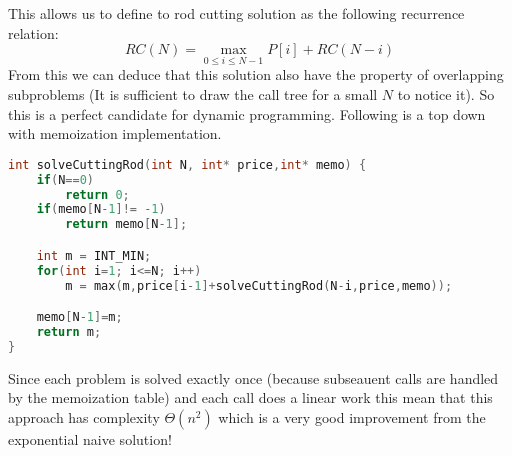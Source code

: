 This allows us to define to rod cutting solution as the following recurrence relation:
\[
RC(N) = \max_{0\leq i\leq N-1} P[i] + RC(N-i)
\]
From this we can deduce that this solution also have the property of overlapping subproblems (It is sufficient to draw the call tree for a small $N$ to notice it).
So this is a perfect candidate for dynamic programming.
Following is a top down with memoization implementation.
\begin{lstlisting}[language=c++, caption="Binary knapsack problem -Memoized solution",label=list:knapqudratic]
int solveCuttingRod(int N, int* price,int* memo) {
    if(N==0)
        return 0;
    if(memo[N-1]!= -1)
        return memo[N-1];

    int m = INT_MIN;
    for(int i=1; i<=N; i++)
        m = max(m,price[i-1]+solveCuttingRod(N-i,price,memo));

    memo[N-1]=m;
    return m;
}

	\end{lstlisting}
Since each problem is solved exactly once (because subseauent calls are handled by the memoization table) and each call does a linear work this mean that this approach has complexity $\Theta(n^2)$ which is a very good improvement from the exponential naive solution!


